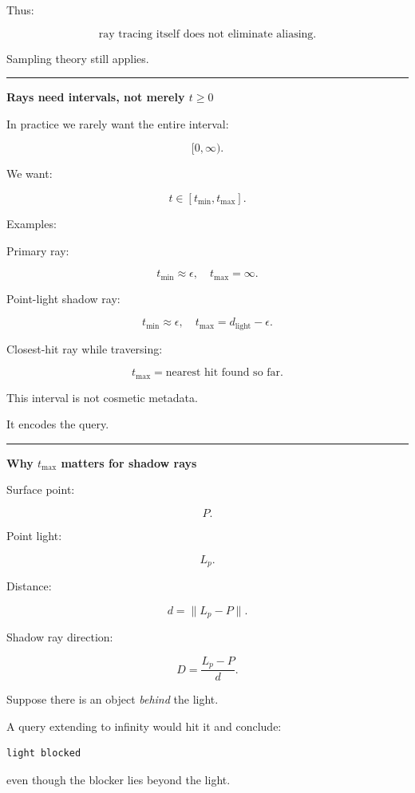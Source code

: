 Thus:

\[
\boxed{
\text{ray tracing itself does not eliminate aliasing}.
}
\]

Sampling theory still applies.

\begin{center}\rule{0.5\linewidth}{0.5pt}\end{center}

\textbf{Rays need intervals, not merely \(t\ge0\)}

In practice we rarely want the entire interval:

\[
[0,\infty).
\]

We want:

\[
\boxed{
t\in[t_{\min},t_{\max}].
}
\]

Examples:

Primary ray:

\[
t_{\min}\approx\epsilon,
\quad
t_{\max}=\infty.
\]

Point-light shadow ray:

\[
t_{\min}\approx\epsilon,
\quad
t_{\max}=d_{\text{light}}-\epsilon.
\]

Closest-hit ray while traversing:

\[
t_{\max}=
\text{nearest hit found so far}.
\]

This interval is not cosmetic metadata.

It encodes the query.

\begin{center}\rule{0.5\linewidth}{0.5pt}\end{center}

\textbf{Why \(t_{\max}\) matters for shadow rays}

Surface point:

\[
P.
\]

Point light:

\[
L_p.
\]

Distance:

\[
d=
\|L_p-P\|.
\]

Shadow ray direction:

\[
D=
\frac{L_p-P}{d}.
\]

Suppose there is an object \emph{behind} the light.

A query extending to infinity would hit it and conclude:

\begin{verbatim}
light blocked
\end{verbatim}

even though the blocker lies beyond the light.

